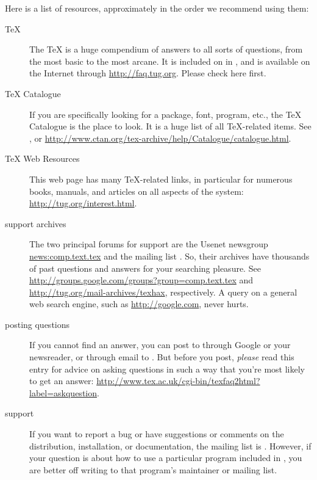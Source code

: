 \documentclass{article}
\begin{document}
Here is a list of resources, approximately in the order we recommend
using them:

\begin{description}
\item [\TeX{} ] The \TeX{}  is a huge compendium of
answers to all sorts of questions, from the most basic to the most
arcane.  It is included on \TeXLive{} in , and is
available on the Internet through \url{http://faq.tug.org}.  Please
check here first.

\item [\TeX{} Catalogue] If you are specifically looking for a package,
font, program, etc., the \TeX{} Catalogue is the place to look.  It is a
huge list of all \TeX{}-related items.  See
, or
\url{http://www.ctan.org/tex-archive/help/Catalogue/catalogue.html}.

\item [\TeX{} Web Resources] This web page has many \TeX{}-related
links, in particular for numerous books, manuals, and articles on all
aspects of the system: \url{http://tug.org/interest.html}.

\item [support archives] The two principal forums for support are the
Usenet newsgroup \url{news:comp.text.tex} and the mailing list
.  So, their archives have thousands of past
questions and answers for your searching pleasure.  See
\url{http://groups.google.com/groups?group=comp.text.tex} and
\url{http://tug.org/mail-archives/texhax}, respectively.  A query on a
general web search engine, such as \url{http://google.com}, never hurts.

\item [posting questions] If you cannot find an answer, you can post to
 through Google or your newsreader, or through
email to .  But before you post, \emph{please}
read this  entry for advice on asking questions in such a way
that you're most likely to get an answer:
\url{http://www.tex.ac.uk/cgi-bin/texfaq2html?label=askquestion}.

\item [\TeXLive{} support] If you want to report a bug or have
suggestions or comments on the \TeXLive{} distribution, installation, or
documentation, the mailing list is .  However,
if your question is about how to use a particular program included in
\TeXLive{}, you are better off writing to that program's maintainer or
mailing list.

\end{description}
\end{document}
